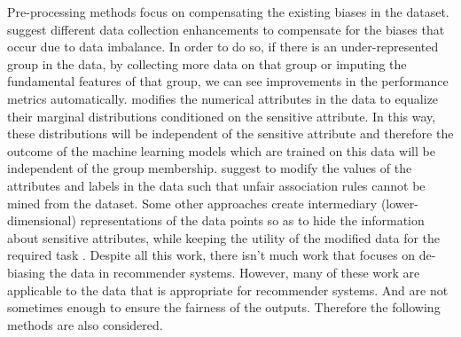 Pre-processing methods focus on compensating the existing biases in the dataset. \cite{chen2018why} suggest different data collection enhancements to compensate for the biases that occur due to data imbalance. In order to do so, if there is an under-represented group in the data, by collecting more data on that group or imputing the fundamental features of that group, we can see improvements in the performance metrics automatically. \cite{Feldman2015} modifies the numerical attributes in the data to equalize their marginal distributions conditioned on the sensitive attribute. In this way, these distributions will be independent of the sensitive attribute and therefore the outcome of the machine learning models which are trained on this data will be independent of the group membership. \cite{hajian2012methodology} suggest to modify the values of the attributes and labels in the data such that unfair association rules cannot be mined from the dataset. Some other approaches create intermediary (lower-dimensional) representations of the data points so as to hide the information about sensitive attributes, while keeping the utility
of the modified data for the required task \cite{zemel2013learning,lahoti2019ifair}. 
Despite all this work, there isn't much work that focuses on de-biasing the data in recommender systems. However, many of these work are applicable to the data that is appropriate for recommender systems. And are not sometimes enough to ensure the fairness of the outputs. Therefore the following methods are also considered.

